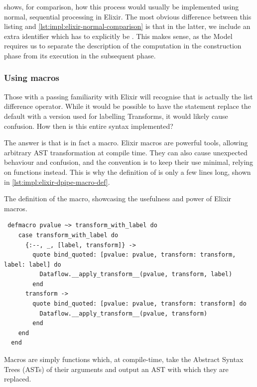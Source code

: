  shows, for comparison, how this process would usually be implemented using normal, sequential processing in Elixir.
The most obvious difference between this listing and \cref{lst:impl:elixir-normal-comparison} is that in the latter, we include an extra  identifier which has to explicitly be .
This makes sense, as the Model requires us to separate the description of the computation in the construction phase from its execution in the subsequent phase.

\subsubsection{Using macros}

Those with a passing familiarity with Elixir will recognise that \exs{--} is actually the list difference operator.
While it would be possible to have the  statement replace the default \exs{--} with a version used for labelling Transforms, it would likely cause confusion.
How then is this entire syntax implemented?

The answer is that \exs{~>} is in fact a macro.
Elixir macros are powerful tools, allowing arbitrary AST transformation at compile time.
They can also cause unexpected behaviour and confusion, and the convention is to keep their use minimal, relying on functions instead.
This is why the definition of \exs{~>} is only a few lines long, shown in \cref{lst:impl:elixir-dpipe-macro-def}.

\begin{listing}[h]
	\caption{The definition of the \exs{~>} macro, showcasing the usefulness and power of Elixir macros.}
	\label{lst:impl:elixir-dpipe-macro-def}
	\begin{verbatim}
 defmacro pvalue ~> transform_with_label do
    case transform_with_label do
      {:--, _, [label, transform]} ->
        quote bind_quoted: [pvalue: pvalue, transform: transform, label: label] do
          Dataflow.__apply_transform__(pvalue, transform, label)
        end
      transform ->
        quote bind_quoted: [pvalue: pvalue, transform: transform] do
          Dataflow.__apply_transform__(pvalue, transform)
        end
    end
  end
	\end{verbatim}
\end{listing}

Macros are simply functions which, at compile-time, take the Abstract Syntax Trees (ASTs) of their arguments and output an AST with which they are replaced.

